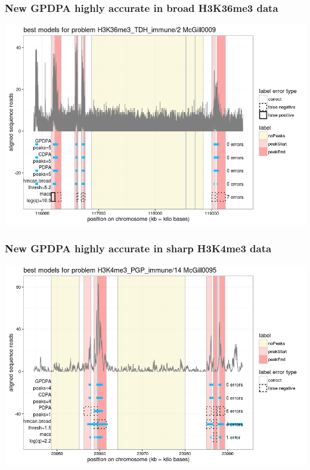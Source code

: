 \documentclass{beamer}
\begin{document}


\begin{frame}
  \frametitle{New GPDPA highly accurate in broad H3K36me3 data}
  \includegraphics[width=\textwidth]{figure-min-train-error-problem5-best}
\end{frame}

\begin{frame}
  \frametitle{New GPDPA highly accurate in sharp H3K4me3 data}
  \includegraphics[width=\textwidth]{figure-min-train-error-problem2-best}
\end{frame} 
 
\end{document}
